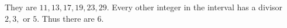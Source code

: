 They are $11,13,17,19,23,29$. Every other integer in the interval has a divisor $2,3,$ or $5$. Thus there are $\boxed6$.
